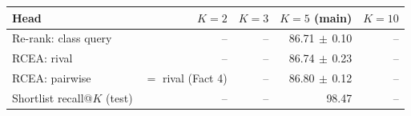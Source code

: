 \begin{tabular}{lrrrr}
\toprule
Head & $K=2$ & $K=3$ & $K=5$ (main) & $K=10$ \\
\midrule
Re-rank: class query & -- & -- & 86.71{\scriptsize$\,\pm\,$0.10} & -- \\
RCEA: rival & -- & -- & 86.74{\scriptsize$\,\pm\,$0.23} & -- \\
RCEA: pairwise & $=$ rival (Fact 4) & -- & 86.80{\scriptsize$\,\pm\,$0.12} & -- \\
\midrule
Shortlist recall@$K$ (test) & -- & -- & 98.47 & -- \\
\bottomrule
\end{tabular}

